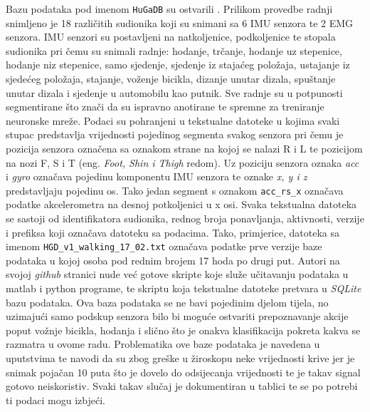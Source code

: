 \documentclass[times, utf8, diplomski]{fer}
\begin{document}
Bazu podataka pod imenom \texttt{HuGaDB} su ostvarili \cite{HuGaDB}. Prilikom provedbe radnji snimljeno je 18 različitih sudionika
koji su snimani sa 6 IMU senzora te 2 EMG senzora. IMU senzori su postavljeni na natkoljenice, podkoljenice te stopala sudionika
pri čemu su snimali radnje: hodanje, trčanje, hodanje uz stepenice, hodanje niz stepenice, samo sjedenje, sjedenje iz stajaćeg položaja,
ustajanje iz sjedećeg položaja, stajanje, voženje bicikla, dizanje unutar dizala, spuštanje unutar dizala i sjedenje
u automobilu kao putnik. Sve radnje su u potpunosti segmentirane što znači da su ispravno anotirane te spremne za treniranje
neuronske mreže. Podaci su pohranjeni u tekstualne datoteke u kojima svaki stupac predstavlja vrijednosti pojedinog segmenta
svakog senzora pri čemu je pozicija senzora označena sa oznakom strane na kojoj se nalazi R i L te pozicijom na nozi F, S i T
(eng. \textit{Foot, Shin i Thigh} redom). Uz poziciju senzora oznaka \textit{acc} i \textit{gyro} označava pojedinu komponentu
IMU senzora te oznake \textit{x, y i z} predstavljaju pojedinu os. Tako jedan segment s oznakom \texttt{acc\_rs\_x} označava
podatke akcelerometra na desnoj potkoljenici u x osi. Svaka tekstualna datoteka se sastoji od identifikatora sudionika,
rednog broja ponavljanja, aktivnosti, verzije i prefiksa koji označava datoteku sa podacima. Tako, primjerice, datoteka sa imenom
\texttt{HGD\_v1\_walking\_17\_02.txt} označava podatke prve verzije baze podataka u kojoj osoba pod rednim brojem 17 hoda po
drugi put. Autori \cite{HuGaDB} na svojoj \textit{github} stranici nude već gotove skripte koje služe učitavanju podataka u
matlab i python programe, te skriptu koja tekstualne datoteke pretvara u \textit{SQLite} bazu podataka.
Ova baza podataka se ne bavi pojedinim djelom tijela, no uzimajući samo podskup 
senzora bilo bi moguće ostvariti prepoznavanje akcije poput vožnje bicikla, hodanja i slično što je onakva klasifikacija pokreta
kakva se razmatra u ovome radu. Problematika ove baze podataka je navedena u uputstvima te navodi da su zbog greške u žiroskopu
neke vrijednosti krive jer je snimak pojačan 10 puta što je dovelo do odsijecanja vrijednosti te je takav signal gotovo neiskoristiv.
Svaki takav slučaj je dokumentiran u tablici te se po potrebi ti podaci mogu izbjeći.
\end{document}
